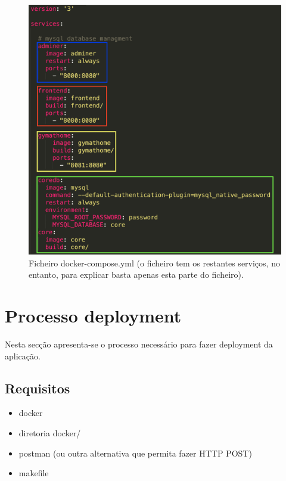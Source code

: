 \begin{figure}[H]
    \centering
    \includegraphics[scale=0.45]{images/deployment/docker-compose.png}
    \caption{Ficheiro docker-compose.yml (o ficheiro tem os restantes serviços, no entanto, para explicar basta apenas esta parte do ficheiro).}
    \label{fig:docker-compose}
\end{figure}


\section{Processo deployment}

\hspace{5mm} Nesta secção apresenta-se o processo necessário para fazer deployment da aplicação.

\subsection{Requisitos}

\begin{itemize}
    \item docker
    \item diretoria docker/
    \item postman (ou outra alternativa que permita fazer HTTP POST)
    \item makefile
\end{itemize}

